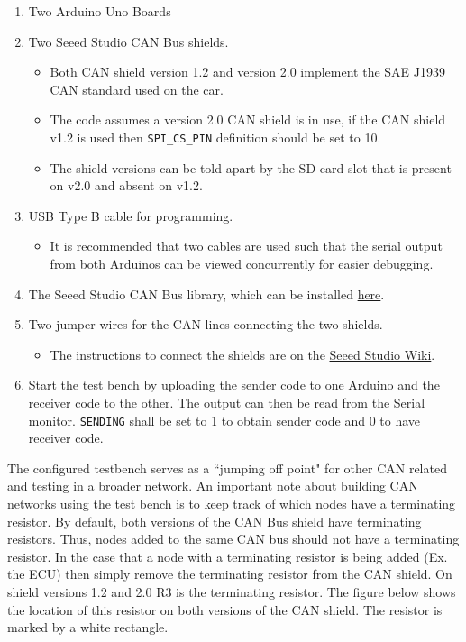 \documentclass[letterpaper]{article}
\begin{document}
\begin{enumerate}
\item Two Arduino Uno Boards
\item Two Seeed Studio CAN Bus shields.
  \begin{itemize}
    \item Both CAN shield version 1.2 and version 2.0 implement the SAE J1939
      CAN standard used on the car.
    \item The code assumes a version 2.0 CAN shield is in use, if the CAN shield
      v1.2 is used then \lstinline{SPI_CS_PIN} definition should be set to 10.
    \item The shield versions can be told apart by the SD card slot that is
      present on v2.0 and absent on v1.2.
  \end{itemize}
\item USB Type B cable for programming.
  \begin{itemize}
    \item It is recommended that two cables are used such that the serial output
      from both Arduinos can be viewed concurrently for easier debugging.
  \end{itemize}
\item The Seeed Studio CAN Bus library, which can be installed
  \href{https://github.com/Seeed-Studio/CAN_BUS_Shield}{here}.
\item Two jumper wires for the CAN lines connecting the two shields.
  \begin{itemize}
    \item The instructions to connect the shields are on the
      \href{http://wiki.seeedstudio.com/CAN-BUS_Shield_V2.0/}{Seeed Studio Wiki}.
  \end{itemize}
\item Start the test bench by uploading the sender code to one Arduino and the
  receiver code to the other. The output can then be read from the Serial
  monitor. \lstinline{SENDING} shall be set to 1 to obtain sender code and 0 to
  have receiver code.
\end{enumerate}

The configured testbench serves as a ``jumping off point" for other CAN related
and testing in a broader network. An important note about building CAN networks
using the test bench is to keep track of which nodes have a terminating
resistor. By default, both versions of the CAN Bus shield have terminating
resistors. Thus, nodes added to the same CAN bus should not have a terminating
resistor. In the case that a node with a terminating resistor is being added
(Ex. the ECU) then simply remove the terminating resistor from the CAN shield.
On shield versions 1.2 and 2.0 R3 is the terminating resistor. The figure below
shows the location of this resistor on both versions of the CAN shield. The
resistor is marked by a white rectangle.
\end{document}
